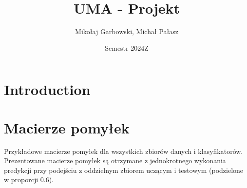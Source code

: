 \documentclass{article}
\title{UMA - Projekt}
\author{Mikołaj Garbowski, Michał Pałasz}
\date{Semestr 2024Z}
\begin{document}
\maketitle

\section{Introduction}

\section{Macierze pomyłek}
Przykładowe macierze pomyłek dla wszystkich zbiorów danych i klasyfikatorów.
Prezentowane macierze pomyłek są otrzymane z jednokrotnego wykonania predykcji przy podejściu z oddzielnym zbiorem uczącym i testowym (podzielone w proporcji $0.6$).
\end{document}
